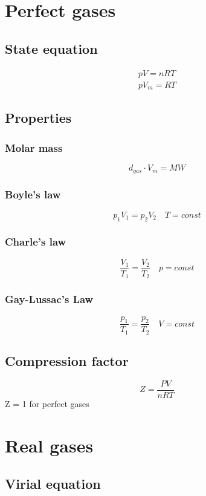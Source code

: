 \documentclass[Master.tex]{subfiles}
\begin{document}
\begin{multicols}{2}

		 \section{Perfect gases}
		  \subsection{State equation}
				   \begin{gather*}
						    pV = nRT\\
						    pV_{m} = RT
				   \end{gather*}
		  \subsection{Properties}
				   \subsubsection{Molar mass}
						    $$ d_{gas} \cdot V_{m} = MW $$
				   \subsubsection{Boyle's law}
						    $$ p_1 V_1 = p_2 V_2 \quad T = const$$
				   \subsubsection{Charle's law}
						    $$ \frac{V_1}{T_1} = \frac{V_2}{T_2} \quad p = const $$
				   \subsubsection{Gay-Lussac's Law}
						    $$ \frac{p_1}{T_1} = \frac{p_2}{T_2} \quad V = const $$

		  \subsection{Compression factor}
				   $$ Z = \frac{PV}{nRT} $$
				   Z = 1 for perfect gases
		 \section{Real gases}
		  \subsection{Virial equation}


\end{multicols}
\end{document}

